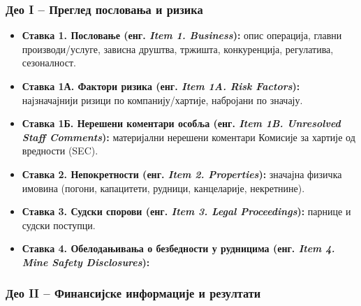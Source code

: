 \subsubsection{Део I – Преглед пословања и ризика}

\begin{itemize}
\item \textbf{Ставка 1. Пословање (енг. \textit{Item 1. Business}):} опис операција, главни производи/услуге, зависна друштва, тржишта, конкуренција, регулатива, сезоналност.

\item \textbf{Ставка 1А. Фактори ризика (енг. \textit{Item 1A. Risk Factors}):} најзначајнији ризици по компанију/хартије, набројани по значају.

\item \textbf{Ставка 1Б. Нерешени коментари особља (енг. \textit{Item 1B. Unresolved Staff Comments}):} материјални нерешени коментари Комисије за хартије од вредности (SEC).

\item \textbf{Ставка 2. Непокретности (енг. \textit{Item 2. Properties}):} значајна физичка имовина (погони, капацитети, рудници, канцеларије, некретнине).

\item \textbf{Ставка 3. Судски спорови (енг. \textit{Item 3. Legal Proceedings}):} парнице и судски поступци.

\item \textbf{Ставка 4. Обелодањивања о безбедности у рудницима (енг. \textit{Item 4. Mine Safety Disclosures}):}
\end{itemize}

\subsubsection{Део II – Финансијске информације и резултати}

